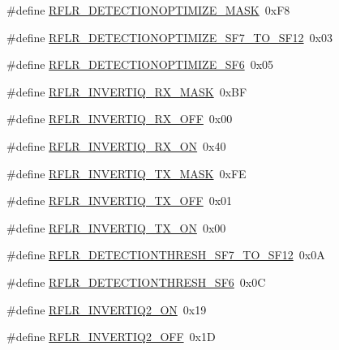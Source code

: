 \begin{DoxyCompactItemize}
\item 
\#define \hyperlink{sx1276Regs-LoRa_8h_aeb175d9d741f888838066955df3e4edb}{R\+F\+L\+R\+\_\+\+D\+E\+T\+E\+C\+T\+I\+O\+N\+O\+P\+T\+I\+M\+I\+Z\+E\+\_\+\+M\+A\+SK}~0x\+F8
\item 
\#define \hyperlink{sx1276Regs-LoRa_8h_ad88e1ef10bcff41afc4074ce1d489320}{R\+F\+L\+R\+\_\+\+D\+E\+T\+E\+C\+T\+I\+O\+N\+O\+P\+T\+I\+M\+I\+Z\+E\+\_\+\+S\+F7\+\_\+\+T\+O\+\_\+\+S\+F12}~0x03
\item 
\#define \hyperlink{sx1276Regs-LoRa_8h_aac16a729154e667b90de0819e702433a}{R\+F\+L\+R\+\_\+\+D\+E\+T\+E\+C\+T\+I\+O\+N\+O\+P\+T\+I\+M\+I\+Z\+E\+\_\+\+S\+F6}~0x05
\item 
\#define \hyperlink{sx1276Regs-LoRa_8h_acd90b646213ae78994111ee2653940b1}{R\+F\+L\+R\+\_\+\+I\+N\+V\+E\+R\+T\+I\+Q\+\_\+\+R\+X\+\_\+\+M\+A\+SK}~0x\+BF
\item 
\#define \hyperlink{sx1276Regs-LoRa_8h_a9c9c9827af6cdbca76caa24df62ccc8e}{R\+F\+L\+R\+\_\+\+I\+N\+V\+E\+R\+T\+I\+Q\+\_\+\+R\+X\+\_\+\+O\+FF}~0x00
\item 
\#define \hyperlink{sx1276Regs-LoRa_8h_a2dfdb9bc15c1adca8287a01803ed2672}{R\+F\+L\+R\+\_\+\+I\+N\+V\+E\+R\+T\+I\+Q\+\_\+\+R\+X\+\_\+\+ON}~0x40
\item 
\#define \hyperlink{sx1276Regs-LoRa_8h_a105fb2d297f6c79929c49e9af746abe6}{R\+F\+L\+R\+\_\+\+I\+N\+V\+E\+R\+T\+I\+Q\+\_\+\+T\+X\+\_\+\+M\+A\+SK}~0x\+FE
\item 
\#define \hyperlink{sx1276Regs-LoRa_8h_a0a85cfee5ae010b871c747d507065d14}{R\+F\+L\+R\+\_\+\+I\+N\+V\+E\+R\+T\+I\+Q\+\_\+\+T\+X\+\_\+\+O\+FF}~0x01
\item 
\#define \hyperlink{sx1276Regs-LoRa_8h_aee577d02af06b8226f3e880bd0e06e0c}{R\+F\+L\+R\+\_\+\+I\+N\+V\+E\+R\+T\+I\+Q\+\_\+\+T\+X\+\_\+\+ON}~0x00
\item 
\#define \hyperlink{sx1276Regs-LoRa_8h_a0b071b81b299c33f0dc61036cb00b5c8}{R\+F\+L\+R\+\_\+\+D\+E\+T\+E\+C\+T\+I\+O\+N\+T\+H\+R\+E\+S\+H\+\_\+\+S\+F7\+\_\+\+T\+O\+\_\+\+S\+F12}~0x0A
\item 
\#define \hyperlink{sx1276Regs-LoRa_8h_a8833cf246a93bf07dca0b0c60fb31eef}{R\+F\+L\+R\+\_\+\+D\+E\+T\+E\+C\+T\+I\+O\+N\+T\+H\+R\+E\+S\+H\+\_\+\+S\+F6}~0x0C
\item 
\#define \hyperlink{sx1276Regs-LoRa_8h_a9eb231f472e12e3a0f4ee8b9dd2586b7}{R\+F\+L\+R\+\_\+\+I\+N\+V\+E\+R\+T\+I\+Q2\+\_\+\+ON}~0x19
\item 
\#define \hyperlink{sx1276Regs-LoRa_8h_aebe752d4de9fd54dac7d4be3ce195b16}{R\+F\+L\+R\+\_\+\+I\+N\+V\+E\+R\+T\+I\+Q2\+\_\+\+O\+FF}~0x1D

\end{DoxyCompactItemize}
